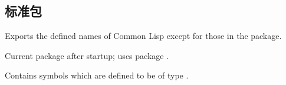 \subsection{标准包}
\begin{LIST}{1cm}

  {
    Exports the defined names of Common Lisp except for those in the
     package.
  }

  {
    Current package after startup; uses package . 
  }

  {
    Contains symbols which are defined to be of type .
  }

\end{LIST}

